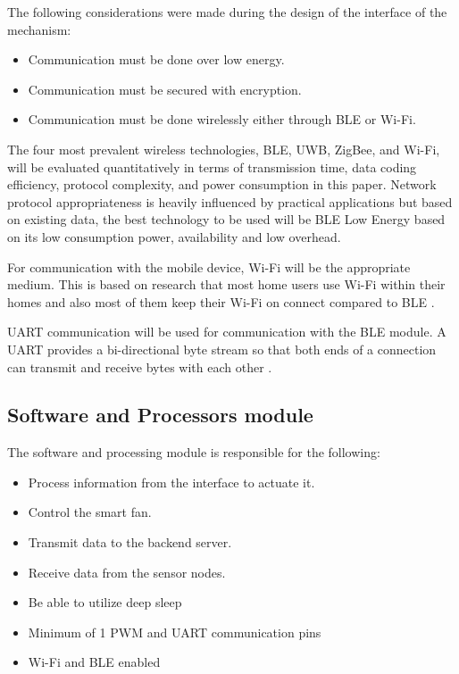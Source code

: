 The following considerations were made during the design of the interface of the mechanism:

\begin{itemize}
\item Communication must be done over low energy.
\item Communication must be secured with encryption.
\item Communication must be done wirelessly either through \ac{BLE} or \ac{Wi-Fi}.
\end{itemize}

The four most prevalent wireless technologies, \ac{BLE}, \ac{UWB}, ZigBee, and \ac{Wi-Fi}, will be evaluated quantitatively in terms of transmission time, data coding efficiency, protocol complexity, and power consumption in this paper. Network protocol appropriateness is heavily influenced by practical applications but based on existing data, the best technology to be used will be \ac{BLE} Low Energy based on its low consumption power, availability and low overhead.
\par
For communication with the mobile device, \ac{Wi-Fi} will be the appropriate medium. This is based on research that most home users use \ac{Wi-Fi} within their homes and also most of them keep their \ac{Wi-Fi} on connect compared to \ac{BLE} \cite{shimray_use_2019}.
\par
\ac{UART} communication will be used for communication with the \ac{BLE} module. A \ac{UART} provides a bi-directional byte stream so that both ends of a connection can transmit and receive bytes with each other \cite{noauthor_uart_2015}.

\subsection{Software and Processors module}

The software and processing module is responsible for the following:

\begin{itemize}
\item Process information from the interface to actuate it.
\item Control the smart fan.
\item Transmit data to the backend server.
\item Receive data from the sensor nodes.
\item Be able to utilize deep sleep
\item Minimum of 1 \ac{PWM} and \ac{UART} communication pins
\item \ac{Wi-Fi} and \ac{BLE} enabled
\end{itemize}

